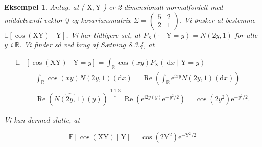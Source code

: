 \documentclass{article}
\newcommand{\1}{\mathbbm{1}}
\theoremstyle{boxed}
\newtheorem{example}[theorem]{Eksempel}
\begin{document}
\begin{example}
    Antag, at ( $\mathrm{X}, \mathrm{Y}$ ) er 2-dimensionalt normalfordelt med middelværdi-vektor $\underline{0}$ og kovariansmatrix $\Sigma=\left(\begin{array}{ll}5 & 2 \\ 2 & 1\end{array}\right)$.
Vi ønsker at bestemme $\mathbb{E}[\cos (\mathrm{XY}) \mid \mathrm{Y}]$.
Vi har tidligere set, at $P_{\mathrm{X}}(\cdot \mid \mathrm{Y}=y)=N(2 y, 1)$ for alle $y$ i $\mathbb{R}$.
Vi finder så ved brug af Sætning 8.3.4, at

$$
\begin{aligned}
\mathbb{E} & {[\cos (\mathrm{XY}) \mid \mathrm{Y}=y]=\int_{\mathbb{R}} \cos (x y) P_{\mathrm{X}}(\mathrm{~d} x \mid \mathrm{Y}=y) } \\
& =\int_{\mathbb{R}} \cos (x y) N(2 y, 1)(\mathrm{d} x)=\operatorname{Re}\left(\int_{\mathbb{R}} \mathrm{e}^{\mathrm{i} x y} N(2 y, 1)(\mathrm{d} x)\right) \\
& =\operatorname{Re}(\widehat{N(2 y, 1)}(y)) \stackrel{1.1 .3}{\stackrel{\downarrow}{=}} \operatorname{Re}\left(\mathrm{e}^{\mathrm{i} 2 y(y)} \mathrm{e}^{-y^2 / 2}\right)=\cos \left(2 y^2\right) \mathrm{e}^{-y^2 / 2} .
\end{aligned}
$$


Vi kan dermed slutte, at

$$
\mathbb{E}[\cos (\mathrm{XY}) \mid \mathrm{Y}]=\cos \left(2 \mathrm{Y}^2\right) \mathrm{e}^{-\mathrm{Y}^2 / 2}
$$

\end{example}
\end{document}
